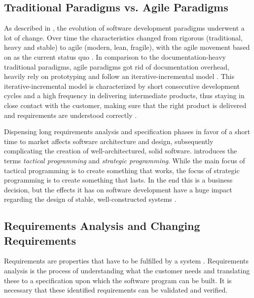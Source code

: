 \subsection{Traditional Paradigms vs. Agile Paradigms}
\label{sub:traditional-vs-agile}
As described in \textcite{mayr_projekt_2005}, the evolution of software development paradigms underwent a lot of change.
Over time the characteristics changed from rigorous (traditional, heavy and stable) to agile (modern, lean, fragile), with the agile movement based on \textcite{fowler_agile_2000} as the current status quo \autocite{ousterhout_philosophy_2018}.
In comparison to the documentation-heavy traditional paradigms, agile paradigms got rid of documentation overhead, heavily rely on prototyping and follow an iterative-incremental model \autocite{mayr_projekt_2005}.
This iterative-incremental model is characterized by short consecutive development cycles and a high frequency in delivering intermediate products, thus staying in close contact with the customer, making sure that the right product is delivered and requirements are understood correctly \autocite{mayr_projekt_2005}.

Dispensing long requirements analysis and specification phases in favor of a short time to market affects software architecture and design, subsequently complicating the creation of well-architectured, solid software.
\textcite{ousterhout_philosophy_2018} introduces the terms \emph{tactical programming} and \emph{strategic programming}.
While the main focus of tactical programming is to create something that works, the focus of strategic programming is to create something that lasts.
In the end this is a business decision, but the effects it has on software development have a huge impact regarding the design of stable, well-constructed systems \autocite{ousterhout_philosophy_2018}.

\subsection{Requirements Analysis and Changing Requirements}
\label{sub:requirements-analysis}
Requirements are properties that have to be fulfilled by a system \autocite{mayr_projekt_2005}.
Requirements analysis is the process of understanding what the customer needs and translating these to a specification upon which the software program can be built.
It is necessary that these identified requirements can be validated and verified.

